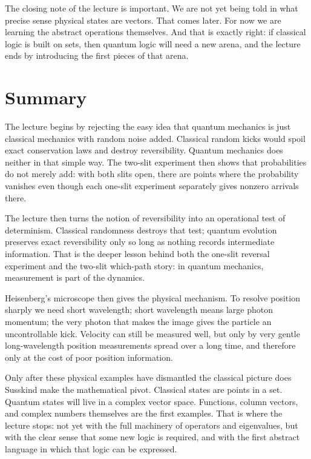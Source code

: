 The closing note of the lecture is important. We are not yet being told in what precise sense physical states are vectors. That comes later. For now we are learning the abstract operations themselves. And that is exactly right: if classical logic is built on sets, then quantum logic will need a new arena, and the lecture ends by introducing the first pieces of that arena.

\section{Summary}

The lecture begins by rejecting the easy idea that quantum mechanics is just classical mechanics with random noise added. Classical random kicks would spoil exact conservation laws and destroy reversibility. Quantum mechanics does neither in that simple way. The two-slit experiment then shows that probabilities do not merely add: with both slits open, there are points where the probability vanishes even though each one-slit experiment separately gives nonzero arrivals there.

The lecture then turns the notion of reversibility into an operational test of determinism. Classical randomness destroys that test; quantum evolution preserves exact reversibility only so long as nothing records intermediate information. That is the deeper lesson behind both the one-slit reversal experiment and the two-slit which-path story: in quantum mechanics, measurement is part of the dynamics.

Heisenberg's microscope then gives the physical mechanism. To resolve position sharply we need short wavelength; short wavelength means large photon momentum; the very photon that makes the image gives the particle an uncontrollable kick. Velocity can still be measured well, but only by very gentle long-wavelength position measurements spread over a long time, and therefore only at the cost of poor position information.

Only after these physical examples have dismantled the classical picture does Susskind make the mathematical pivot. Classical states are points in a set. Quantum states will live in a complex vector space. Functions, column vectors, and complex numbers themselves are the first examples. That is where the lecture stops: not yet with the full machinery of operators and eigenvalues, but with the clear sense that some new logic is required, and with the first abstract language in which that logic can be expressed.